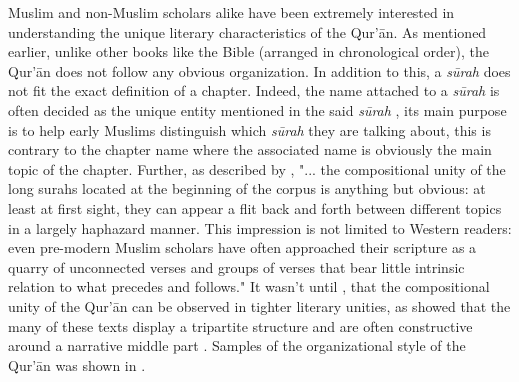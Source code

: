 Muslim and non-Muslim scholars alike have been extremely interested in understanding the unique literary characteristics of the Qur'\=an. As mentioned earlier, unlike other books like the Bible (arranged in chronological order), the Qur'\=an does not follow any obvious organization. In addition to this, a \textit{s\=urah}  does not fit the exact definition of a chapter. Indeed, the name attached to a \textit{s\=urah}  is often decided as the unique entity mentioned in the said \textit{s\=urah} , its main purpose is to help early Muslims distinguish which \textit{s\=urah}  they are talking about, this is contrary to the chapter name where the associated name is obviously the main topic of the chapter. Further, as described by , "... the compositional unity of the long surahs located at the beginning of the corpus is anything but obvious: at least at first sight, they can appear a flit back and forth between different topics in a largely haphazard manner. This impression is not limited to Western readers: even pre-modern Muslim scholars have often approached their scripture as a quarry of unconnected verses and groups of verses that bear little intrinsic relation to what precedes and follows." It wasn't until , that the compositional unity of the Qur'\=an can be observed in tighter literary unities, as  showed that the many of these texts display a tripartite structure and are often constructive around a narrative middle part \cite{sinai2017}. Samples of the organizational style of the Qur'\=an was shown in .